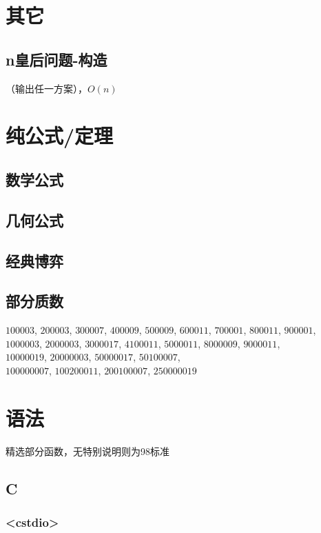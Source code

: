 \documentclass[10pt]{article}
\begin{document}
\section{其它}
\subsection{n皇后问题-构造}
（输出任一方案），$O(n)$

\section{纯公式/定理}
\subsection{数学公式}


\subsection{几何公式}


\subsection{经典博弈}


\subsection{部分质数}
\noindent
$100003$, $200003$, $300007$, $400009$, $500009$, $600011$, $700001$, $800011$, $900001$, \\
$1000003$, $2000003$, $3000017$, $4100011$, $5000011$, $8000009$, $9000011$, \\
$10000019$, $20000003$, $50000017$, $50100007$, \\
$100000007$, $100200011$, $200100007$, $250000019$
\section{语法}
精选部分函数，无特别说明则为98标准
\subsection{C}
\subsubsection{<cstdio>}

\end{document}
